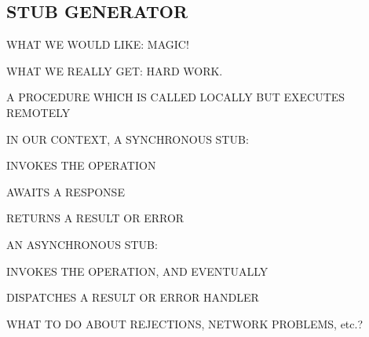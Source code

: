 

\begin{bwslide}
\part*	{STUB GENERATOR}\bf

\begin{nrtc}
\item	WHAT WE WOULD LIKE: MAGIC!

\item	WHAT WE REALLY GET: HARD WORK.
\end{nrtc}
\end{bwslide}


\begin{bwslide}

\begin{nrtc}
\item	A PROCEDURE WHICH IS CALLED LOCALLY BUT EXECUTES REMOTELY

\item	IN OUR CONTEXT, A SYNCHRONOUS STUB:
    \begin{nrtc}
    \item	INVOKES THE OPERATION

    \item	AWAITS A RESPONSE

    \item	RETURNS A RESULT OR ERROR
    \end{nrtc}

\item	AN ASYNCHRONOUS STUB:
    \begin{nrtc}
    \item	INVOKES THE OPERATION, AND EVENTUALLY

    \item	DISPATCHES A RESULT OR ERROR HANDLER
    \end{nrtc}

\item	WHAT TO DO ABOUT REJECTIONS, NETWORK PROBLEMS, etc.?
\end{nrtc}
\end{bwslide}


